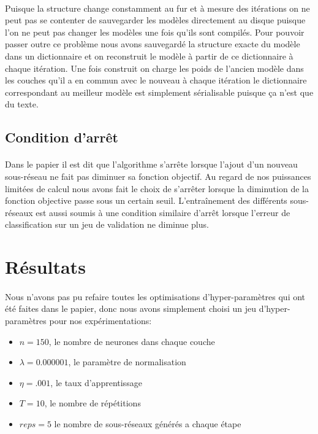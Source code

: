 \documentclass[11 pt]{article}
\begin{document}
\paragraph{} Puisque la structure change constamment au fur et à mesure des itérations on ne peut pas se contenter de sauvegarder les modèles directement au disque puisque l'on ne peut pas changer les modèles une fois qu'ils sont compil\'es. Pour pouvoir passer outre ce problème nous avons sauvegard\'e la structure exacte du modèle dans un dictionnaire et on reconstruit le modèle \`a partir de ce dictionnaire à chaque itération. Une fois construit on charge les poids de l'ancien modèle dans les couches qu'il a en commun avec le nouveau à chaque itération le dictionnaire correspondant au meilleur modèle est simplement s\'erialisable puisque ça n'est que du texte. 

\subsection{Condition d’arrêt}
\paragraph{}Dans le papier il est dit que l'algorithme s’arrête lorsque l'ajout d'un nouveau sous-réseau ne fait pas diminuer sa fonction objectif. Au regard de nos puissances limitées de calcul nous avons fait le choix de s’arrêter lorsque la diminution de la fonction objective passe sous un certain seuil. L’entraînement des différents sous-réseaux est aussi soumis à une condition similaire d’arrêt lorsque l'erreur de classification sur un jeu de validation ne diminue plus. 

\section{Résultats}
\paragraph{}Nous n'avons pas pu refaire toutes les optimisations d'hyper-paramètres qui ont été faites dans le papier, donc nous avons simplement choisi un jeu d'hyper-paramètres pour nos expérimentations:
\begin{itemize}
  \item $n = 150$, le nombre de neurones dans chaque couche
  \item $\lambda = 0.000001$, le paramètre de normalisation
  \item $\eta = .001$, le taux d'apprentissage
  \item $T = 10$, le nombre de répétitions
  \item $reps = 5$ le nombre de sous-réseaux générés a chaque étape
\end{itemize}
\end{document}
